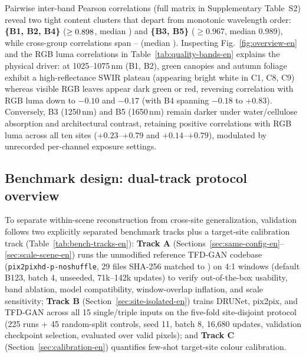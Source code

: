 \documentclass[a4paper,10pt]{article}
\begin{document}
Pairwise inter-band Pearson correlations (full matrix in Supplementary Table~S2) reveal two tight content clusters that depart from monotonic wavelength order: \textbf{\{B1, B2, B4\}} ($\ge0.898$, median \CorrWithinMedian) and \textbf{\{B3, B5\}} ($\ge 0.967$, median 0.989), while cross-group correlations span \CorrCrossMin--\CorrCrossMax{} (median \CorrCrossMedian). Inspecting Fig.~\ref{fig:overview-en} and the RGB luma correlations in Table~\ref{tab:quality-bands-en} explains the physical driver: at 1025--1075\,nm (B1, B2), green canopies and autumn foliage exhibit a high-reflectance SWIR plateau (appearing bright white in C1, C8, C9) whereas visible RGB leaves appear dark green or red, reversing correlation with RGB luma down to $-0.10$ and $-0.17$ (with B4 spanning $-0.18$ to $+0.83$). Conversely, B3 (1250\,nm) and B5 (1650\,nm) remain darker under water/cellulose absorption and architectural contrast, retaining positive correlations with RGB luma across all ten sites ($+0.23$--$+0.79$ and $+0.14$--$+0.79$), modulated by unrecorded per-channel exposure settings.

\subsection{Benchmark design: dual-track protocol overview}\label{sec:bench-overview-en}
To separate within-scene reconstruction from cross-site generalization, validation follows two explicitly separated benchmark tracks plus a target-site calibration track (Table~\ref{tab:bench-tracks-en}): \textbf{Track A} (Sections~\ref{sec:same-config-en}--\ref{sec:scale-scene-en}) runs the unmodified reference TFD-GAN codebase (\texttt{pix2pixhd-p-noshuffle}, 29 files SHA-256 matched to \cite{chen2026thesis}) on 4:1 windows (default B123, batch 4, unseeded, 71k--142k updates) to verify out-of-the-box usability, band ablation, model compatibility, window-overlap inflation, and scale sensitivity; \textbf{Track B} (Section~\ref{sec:site-isolated-en}) trains DRUNet, pix2pix, and TFD-GAN across all 15 single/triple inputs on the five-fold site-disjoint protocol (225 runs + 45 random-split controls, seed 11, batch 8, 16,680 updates, validation checkpoint selection, evaluated over \SupportPixelCount{} valid pixels); and \textbf{Track C} (Section~\ref{sec:calibration-en}) quantifies few-shot target-site colour calibration.
\end{document}
